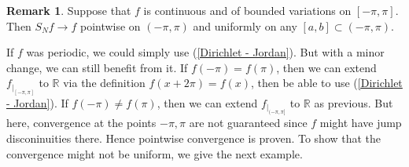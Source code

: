 \documentclass[12pt]{amsart}
\theoremstyle{definition}
\newtheorem{remark}[theorem]{Remark}
\newcommand{\RR}{{\mathbb R}} %
\begin{document}
\begin{remark}
    Suppose that $f$ is continuous and of bounded variations on $[-\pi,\pi]$. Then $S_Nf \to f$ pointwise on $(-\pi,\pi)$ and uniformly on any $[a,b] \subset (-\pi,\pi)$.
\end{remark}



If $f$ was periodic, we could simply use (\ref{Dirichlet - Jordan}).
But with a minor change, we can still benefit from it. If $f(-\pi) = f(\pi)$,
then we can extend $f_{|_{[-\pi,\pi]}}$ to $\RR$ via the definition $f(x + 2\pi) = f(x)$,
then be able to use (\ref{Dirichlet - Jordan}). If $f(-\pi) \neq f(\pi)$, then we can extend $f_{|_{(-\pi,\pi]}}$
to $\RR$ as previous. But here, convergence at the points ${-\pi,\pi}$ are not guaranteed since $f$ might have jump disconinuities there.
Hence pointwise convergence is proven. To show that the convergence might not be uniform, we give the next example.
\end{document}
